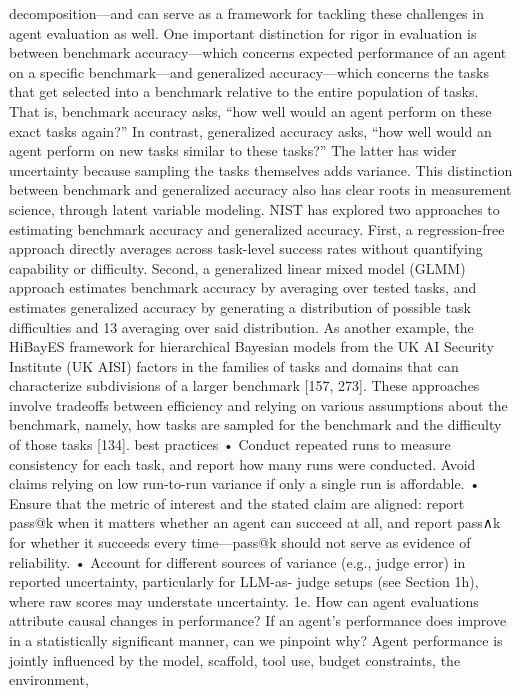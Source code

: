 decomposition—and can serve as a framework for tackling these challenges in agent evaluation as well.
One important distinction for rigor in evaluation is between benchmark accuracy—which concerns expected
performance of an agent on a specific benchmark—and generalized accuracy—which concerns the tasks that
get selected into a benchmark relative to the entire population of tasks. That is, benchmark accuracy asks,
“how well would an agent perform on these exact tasks again?” In contrast, generalized accuracy asks, “how
well would an agent perform on new tasks similar to these tasks?” The latter has wider uncertainty because
sampling the tasks themselves adds variance. This distinction between benchmark and generalized accuracy
also has clear roots in measurement science, through latent variable modeling. NIST has explored two
approaches to estimating benchmark accuracy and generalized accuracy. First, a regression-free approach
directly averages across task-level success rates without quantifying capability or difficulty. Second, a
generalized linear mixed model (GLMM) approach estimates benchmark accuracy by averaging over tested
tasks, and estimates generalized accuracy by generating a distribution of possible task difficulties and
13
averaging over said distribution. As another example, the HiBayES framework for hierarchical Bayesian
models from the UK AI Security Institute (UK AISI) factors in the families of tasks and domains that can
characterize subdivisions of a larger benchmark [157, 273]. These approaches involve tradeoffs between
efficiency and relying on various assumptions about the benchmark, namely, how tasks are sampled for the
benchmark and the difficulty of those tasks [134].
best practices
• Conduct repeated runs to measure consistency for each task, and report how many runs were conducted.
Avoid claims relying on low run-to-run variance if only a single run is affordable.
• Ensure that the metric of interest and the stated claim are aligned: report pass@k when it matters whether
an agent can succeed at all, and report pass∧k for whether it succeeds every time—pass@k should not serve
as evidence of reliability.
• Account for different sources of variance (e.g., judge error) in reported uncertainty, particularly for LLM-as-
judge setups (see Section 1h), where raw scores may understate uncertainty.
1e. How can agent evaluations attribute causal changes in performance?
If an agent’s performance does improve in a statistically significant manner, can we pinpoint why? Agent
performance is jointly influenced by the model, scaffold, tool use, budget constraints, the environment,
